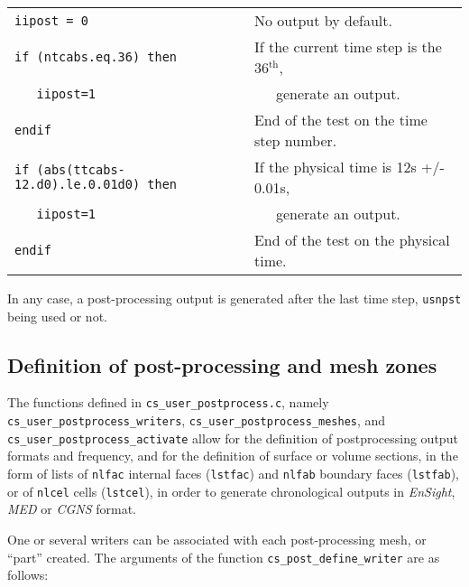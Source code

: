 {{{\begin{tabular}{ll}
\mbox{\texttt{iipost = 0}}
                    & No output by default. \\
\mbox{\texttt{if (ntcabs.eq.36) then}}
                    & If the current time step is the 36$^{\text{th}}$,\\
\mbox{\texttt{~~~iipost=1}}
                    & ~~~generate an output. \\
\mbox{\texttt{endif}}
                    & End of the test on the time step number. \\
\mbox{\texttt{if (abs(ttcabs-12.d0).le.0.01d0) then}}
                    & If the physical time is 12s +/- 0.01s,\\
\mbox{\texttt{~~~iipost=1}}
                    & ~~~generate an output. \\
\mbox{\texttt{endif}}
                    & End of the test on the physical time. \\
\end{tabular}

In any case, a post-processing output is generated after the last time
step, \texttt{usnpst} being used or not.

\newpage
\subsection{Definition of post-processing and mesh zones}

The functions defined in \texttt{cs\_user\_postprocess.c}, namely
\texttt{cs\_user\_postprocess\_writers}, \texttt{cs\_user\_postprocess\_meshes},
and \texttt{cs\_user\_postprocess\_activate} allow for
the definition of postprocessing output formats and frequency, and
for the definition of  surface or volume sections, in the form
of lists of \texttt{nlfac} internal faces (\texttt{lstfac}) and
\texttt{nlfab} boundary faces (\texttt{lstfab}),
or of \texttt{nlcel} cells (\texttt{lstcel}), in order to generate
chronological outputs in {\em EnSight}, {\em MED} or {\em CGNS} format.

One or several writers can be associated with each post-processing
mesh, or ``part'' created. The arguments of the function
\texttt{cs\_post\_define\_writer} are as follows:

}}}
